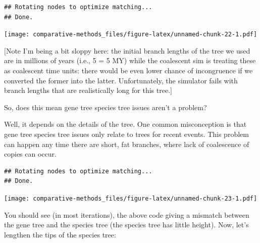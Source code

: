 \documentclass[]{article}
\newenvironment{Shaded}{\begin{snugshade}}{\end{snugshade}}
\newcommand{\DecValTok}[1]{\textcolor[rgb]{0.00,0.00,0.81}{#1}}
\newcommand{\KeywordTok}[1]{\textcolor[rgb]{0.13,0.29,0.53}{\textbf{#1}}}
\newcommand{\NormalTok}[1]{#1}
\newcommand{\OperatorTok}[1]{\textcolor[rgb]{0.81,0.36,0.00}{\textbf{#1}}}
\newcommand{\StringTok}[1]{\textcolor[rgb]{0.31,0.60,0.02}{#1}}
\theoremstyle{definition}
\theoremstyle{definition}
\theoremstyle{definition}
\theoremstyle{remark}
\begin{document}
\begin{verbatim}
## Rotating nodes to optimize matching...
## Done.
\end{verbatim}

\texttt{[image: comparative-methods\_files/figure-latex/unnamed-chunk-22-1.pdf]}

{[}Note I'm being a bit sloppy here: the initial branch lengths of the
tree we used are in millions of years (i.e., 5 = 5 MY) while the
coalescent sim is treating these as coalescent time units: there would
be even lower chance of incongruence if we converted the former into the
latter. Unfortunately, the simulator fails with branch lengths that are
realistically long for this tree.{]}

So, does this mean gene tree species tree issues aren't a problem?

Well, it depends on the details of the tree. One common misconception is
that gene tree species tree issues only relate to trees for recent
events. This problem can happen any time there are short, fat branches,
where lack of coalescence of copies can occur.

\begin{Shaded}
\end{Shaded}

\begin{verbatim}
## Rotating nodes to optimize matching...
## Done.
\end{verbatim}

\texttt{[image: comparative-methods\_files/figure-latex/unnamed-chunk-23-1.pdf]}

You should see (in most iterations), the above code giving a mismatch
between the gene tree and the species tree (the species tree has little
height). Now, let's lengthen the tips of the species tree:
\end{document}
